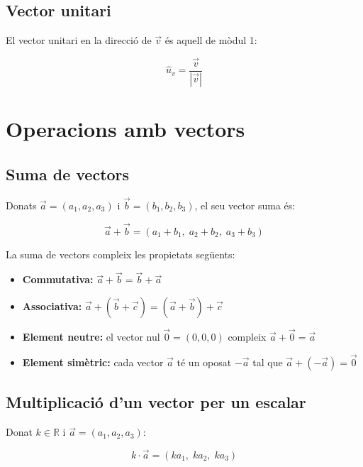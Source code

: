 \subsection{Vector unitari}

El vector unitari en la direcció de $\vec v$ és aquell de mòdul 1:

\begin{equation*}
\hat u_v = \frac{\vec v}{|\vec v|}
\end{equation*}

\section{Operacions amb vectors}

\subsection{Suma de vectors}

Donats $\vec a = (a_1, a_2, a_3)$ i $\vec b = (b_1, b_2, b_3)$, el seu vector suma és:

\begin{equation*}
\vec a + \vec b = (a_1 + b_1,\; a_2 + b_2,\; a_3 + b_3)
\end{equation*}

La suma de vectors compleix les propietats següents:

\begin{itemize}
\item \textbf{Commutativa:} $\vec a + \vec b = \vec b + \vec a$
\item \textbf{Associativa:} $\vec a + (\vec b + \vec c) = (\vec a + \vec b) + \vec c$
\item \textbf{Element neutre:} el vector nul $\vec 0 = (0, 0, 0)$ compleix $\vec a + \vec 0 = \vec a$
\item \textbf{Element simètric:} cada vector $\vec a$ té un oposat $-\vec a$ tal que $\vec a + (-\vec a) = \vec 0$
\end{itemize}

\subsection{Multiplicació d'un vector per un escalar}

Donat $k \in \mathbb{R}$ i $\vec a = (a_1, a_2, a_3)$:

\begin{equation*}
k\cdot\vec a = (k a_1,\; k a_2,\; k a_3)
\end{equation*}

